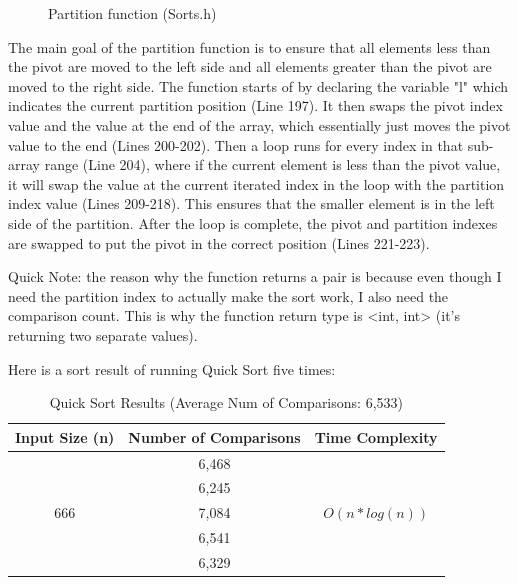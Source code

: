 \documentclass[letterpaper, 10pt]{article}
\begin{document}
\begin{figure}[H]
  \centering
  
  \caption{Partition function (Sorts.h)}
  \label{fig:figure4.8-part2}
\end{figure}

\noindent
The main goal of the partition function is to ensure that all elements less than the pivot are moved to the left side and all elements greater than the pivot are moved to the right side. The function starts of by declaring the variable "l" which indicates the current partition position (Line 197). It then swaps the pivot index value and the value at the end of the array, which essentially just moves the pivot value to the end (Lines 200-202). Then a loop runs for every index in that sub-array range (Line 204), where if the current element is less than the pivot value, it will swap the value at the current iterated index in the loop with the partition index value (Lines 209-218). This ensures that the smaller element is in the left side of the partition. After the loop is complete, the pivot and partition indexes are swapped to put the pivot in the correct position (Lines 221-223).

\noindent
Quick Note: the reason why the function returns a pair is because even though I need the partition index to actually make the sort work, I also need the comparison count. This is why the function return type is <int, int> (it's returning two separate values).

\vspace{1em}
\noindent
Here is a sort result of running Quick Sort five times:
\begin{table}[H]
\centering
\begin{tabular}{|c|c|c|}
\hline
\textbf{Input Size (n)} & \textbf{Number of Comparisons} & \textbf{Time Complexity} \\
\hline
\multirow{5}{*}{666} & 6,468 & \\
                     & 6,245 & \\
                     & 7,084 & $O(n * log(n))$ \\
                     & 6,541 & \\
                     & 6,329 & \\
\hline
\end{tabular}
\caption{Quick Sort Results (Average Num of Comparisons: 6,533)}
\end{table}
\end{document}
